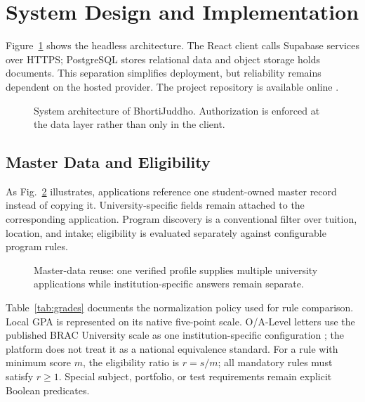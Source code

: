 \documentclass[conference,letterpaper]{IEEEtran}
\begin{document}
\section{System Design and Implementation}
Figure~\ref{fig:architecture} shows the headless architecture. The React client calls Supabase services over HTTPS; PostgreSQL stores relational data and object storage holds documents. This separation simplifies deployment, but reliability remains dependent on the hosted provider. The project repository is available online \cite{repository}.

\begin{figure}[!t]
\centering
\resizebox{0.67\columnwidth}{!}{}
\caption{System architecture of BhortiJuddho. Authorization is enforced at the data layer rather than only in the client.}
\label{fig:architecture}
\end{figure}

\subsection{Master Data and Eligibility}
As Fig.~\ref{fig:master-data} illustrates, applications reference one student-owned master record instead of copying it. University-specific fields remain attached to the corresponding application. Program discovery is a conventional filter over tuition, location, and intake; eligibility is evaluated separately against configurable program rules.

\begin{figure}[!t]
\centering

\caption{Master-data reuse: one verified profile supplies multiple university applications while institution-specific answers remain separate.}
\label{fig:master-data}
\end{figure}

Table~\ref{tab:grades} documents the normalization policy used for rule comparison. Local GPA is represented on its native five-point scale. O/A-Level letters use the published BRAC University scale as one institution-specific configuration \cite{bracgrades}; the platform does not treat it as a national equivalence standard. For a rule with minimum score $m$, the eligibility ratio is $r=s/m$; all mandatory rules must satisfy $r\geq1$. Special subject, portfolio, or test requirements remain explicit Boolean predicates.
\end{document}
